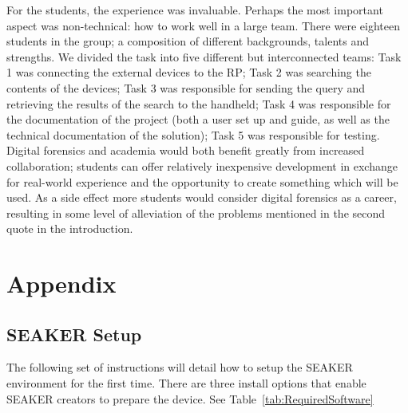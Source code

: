 \documentclass[12pt]{article}
\begin{document}
For the students, the experience was invaluable. Perhaps the most important aspect was non-technical:
how to work well in a large team. There were eighteen students in the group; a composition of different
backgrounds, talents and strengths. We divided the task into five different but interconnected teams:
Task 1 was connecting the external devices to the RP; Task 2 was searching the contents of the
devices; Task 3 was responsible for sending the query and retrieving the results of the search to the
handheld; Task 4 was responsible for the documentation of the project (both a user set up and guide,
as well as the technical documentation of the solution); Task 5 was responsible for testing.\\

Digital forensics and academia would both benefit greatly from increased collaboration; students can
offer relatively inexpensive development in exchange for real-world experience and the opportunity to
create something which will be used. As a side effect more students would consider digital forensics
as a career, resulting in some level of alleviation of the problems mentioned in the second quote in the
introduction\cite{hitchcock2016tiered}.


\section{Appendix}
\label{sect-Appendix}

\subsection{SEAKER Setup}
The following set of instructions will detail how to setup the SEAKER
environment for the first time. There are three install options that
enable SEAKER creators to prepare the device.  See
Table~\ref{tab:RequiredSoftware}
\end{document}
